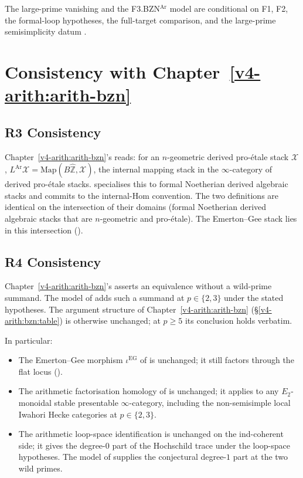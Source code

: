 The large-prime vanishing and the F3.BZN\({}^{\mathrm{Ar}}\) model
are conditional on F1, F2, the formal-loop hypotheses, the full-target
comparison, and the large-prime semisimplicity datum
.

\section{Consistency with Chapter~\ref{v4-arith:arith-bzn}}
\label{v4-arith:bzn-rcompletion:consistency}

\subsection{R3 Consistency}

Chapter~\ref{v4-arith:arith-bzn}'s
 reads: for an \(n\)-geometric derived
pro-\'etale stack \(\mathcal{X}\), \(L^{\mathrm{Ar}}\mathcal{X}=\mathrm{Map}(B\widehat{\mathbb{Z}},\mathcal{X})\),
the internal mapping stack in the \(\infty\)-category of derived
pro-\'etale stacks. 
specialises this to formal Noetherian derived algebraic stacks
and commits to the internal-Hom convention. The two definitions
are identical on the intersection of their domains (formal
Noetherian derived algebraic stacks that are \(n\)-geometric and
pro-\'etale). The Emerton--Gee stack lies in this intersection
().

\subsection{R4 Consistency}

Chapter~\ref{v4-arith:arith-bzn}'s
 asserts an equivalence without a
wild-prime summand. The model of
 adds such a
summand at \(p\in\{2,3\}\) under the stated hypotheses.
The argument structure of Chapter~\ref{v4-arith:arith-bzn}
(\S\ref{v4-arith:bzn:table}) is otherwise unchanged; at \(p\geq 5\)
its conclusion holds verbatim.

In particular:
\begin{itemize}
\item The Emerton--Gee morphism
\(\iota^{\mathrm{EG}}\) of  is
unchanged; it still factors through the flat locus
().
\item The arithmetic factorisation homology of
 is unchanged; it
applies to any \(E_{2}\)-monoidal stable presentable
\(\infty\)-category, including the non-semisimple local Iwahori
Hecke categories at \(p\in\{2,3\}\).
\item The arithmetic loop-space identification
 is unchanged on the
ind-coherent side; it gives the degree-\(0\) part of the
Hochschild trace under the loop-space hypotheses. The model of
 supplies
the conjectural degree-\(1\) part at the two wild primes.
\end{itemize}

